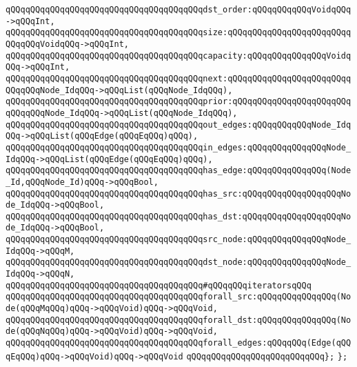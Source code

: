 \verb|qQQqqQQqqQQqqQQqqQQqqQQqqQQqqQQqqQQqqQQqdst_order:qQQqqQQqqQQqVoidqQQq->qQQqInt,|\newline
\verb|qQQqqQQqqQQqqQQqqQQqqQQqqQQqqQQqqQQqqQQqsize:qQQqqQQqqQQqqQQqqQQqqQQqqQQqqQQqVoidqQQq->qQQqInt,|\newline
\verb|qQQqqQQqqQQqqQQqqQQqqQQqqQQqqQQqqQQqqQQqcapacity:qQQqqQQqqQQqqQQqVoidqQQq->qQQqInt,|\newline
\verb|qQQqqQQqqQQqqQQqqQQqqQQqqQQqqQQqqQQqqQQqnext:qQQqqQQqqQQqqQQqqQQqqQQqqQQqqQQqNode_IdqQQq->qQQqList(qQQqNode_IdqQQq),|\newline
\verb|qQQqqQQqqQQqqQQqqQQqqQQqqQQqqQQqqQQqqQQqprior:qQQqqQQqqQQqqQQqqQQqqQQqqQQqqQQqNode_IdqQQq->qQQqList(qQQqNode_IdqQQq),|\newline
\verb|qQQqqQQqqQQqqQQqqQQqqQQqqQQqqQQqqQQqqQQqout_edges:qQQqqQQqqQQqNode_IdqQQq->qQQqList(qQQqEdge(qQQqEqQQq)qQQq),|\newline
\verb|qQQqqQQqqQQqqQQqqQQqqQQqqQQqqQQqqQQqqQQqin_edges:qQQqqQQqqQQqqQQqNode_IdqQQq->qQQqList(qQQqEdge(qQQqEqQQq)qQQq),|\newline
\verb|qQQqqQQqqQQqqQQqqQQqqQQqqQQqqQQqqQQqqQQqhas_edge:qQQqqQQqqQQqqQQq(Node_Id,qQQqNode_Id)qQQq->qQQqBool,|\newline
\verb|qQQqqQQqqQQqqQQqqQQqqQQqqQQqqQQqqQQqqQQqhas_src:qQQqqQQqqQQqqQQqqQQqNode_IdqQQq->qQQqBool,|\newline
\verb|qQQqqQQqqQQqqQQqqQQqqQQqqQQqqQQqqQQqqQQqhas_dst:qQQqqQQqqQQqqQQqqQQqNode_IdqQQq->qQQqBool,|\newline
\verb|qQQqqQQqqQQqqQQqqQQqqQQqqQQqqQQqqQQqqQQqsrc_node:qQQqqQQqqQQqqQQqNode_IdqQQq->qQQqM,|\newline
\verb|qQQqqQQqqQQqqQQqqQQqqQQqqQQqqQQqqQQqqQQqdst_node:qQQqqQQqqQQqqQQqNode_IdqQQq->qQQqN,|\newline
\newline
\verb|qQQqqQQqqQQqqQQqqQQqqQQqqQQqqQQqqQQqqQQq#qQQqqQQqiteratorsqQQq|\newline
\verb|qQQqqQQqqQQqqQQqqQQqqQQqqQQqqQQqqQQqqQQqforall_src:qQQqqQQqqQQqqQQq(Node(qQQqMqQQq)qQQq->qQQqVoid)qQQq->qQQqVoid,|\newline
\verb|qQQqqQQqqQQqqQQqqQQqqQQqqQQqqQQqqQQqqQQqforall_dst:qQQqqQQqqQQqqQQq(Node(qQQqNqQQq)qQQq->qQQqVoid)qQQq->qQQqVoid,|\newline
\verb|qQQqqQQqqQQqqQQqqQQqqQQqqQQqqQQqqQQqqQQqforall_edges:qQQqqQQq(Edge(qQQqEqQQq)qQQq->qQQqVoid)qQQq->qQQqVoid|\newline
\verb|qQQqqQQqqQQqqQQqqQQqqQQqqQQq};|\newline
\verb|};|\newline
\newline

